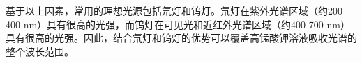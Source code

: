 \documentclass[dvipsnames, svgnames,a4paper,11pt]{article}
\begin{document}
	基于以上因素，常用的理想光源包括氘灯和钨灯。氘灯在紫外光谱区域（约200-400 nm）具有很高的光强，而钨灯在可见光和近红外光谱区域（约400-700 nm）具有很高的光强。因此，结合氘灯和钨灯的优势可以覆盖高锰酸钾溶液吸收光谱的整个波长范围。
	
	
	
	
	
	
	
	
	
	
	
%
%

%		
%		
%		
%		
\end{document}
